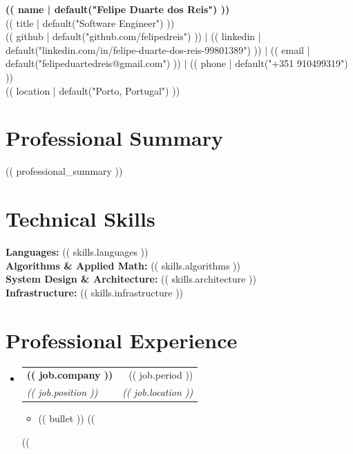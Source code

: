 \documentclass[11pt, letterpaper]{article}
\makeatletter
\newcommand{\resumeItem}[1]{\item \small{#1 \vspace{-2pt}}}
\newcommand{\resumeSubheading}[4]{
  \vspace{3pt}\item
    \begin{tabular*}{0.98\textwidth}[t]{l@{\extracolsep{\fill}}r}
      \textbf{#1} & #2 \\
      \textit{#3} & \textit{\small #4} \\
    \end{tabular*}\vspace{-5pt}
}
\makeatother
\begin{document}
\begin{center}
    {\LARGE \textbf{(( name | default("Felipe Duarte dos Reis") ))}} \\ \vspace{4pt}
    (( title | default("Software Engineer") )) \\
    \small 
    (( github | default("github.com/felipedreis") )) $|$ 
    (( linkedin | default("linkedin.com/in/felipe-duarte-dos-reis-99801389") )) $|$
    (( email | default("felipeduartedreis@gmail.com") )) $|$
    (( phone | default("+351 910499319") ))\\
    \small \faMapMarker \space (( location | default("Porto, Portugal") ))
\end{center}

\section{Professional Summary}
\vspace{2pt}
\small{(( professional_summary ))}

\section{Technical Skills}
\vspace{2pt}
\small{
\textbf{Languages:} (( skills.languages )) \\
\textbf{Algorithms \& Applied Math:} (( skills.algorithms )) \\
\textbf{System Design \& Architecture:} (( skills.architecture )) \\
\textbf{Infrastructure:} (( skills.infrastructure ))
}

\section{Professional Experience}
\begin{itemize}[leftmargin=0in, label={}]

    ((%
    \resumeSubheading
      {(( job.company ))}{(( job.period ))}
      {(( job.position ))}{(( job.location ))}
      \begin{itemize}
        ((%
        \resumeItem{(( bullet ))}
        ((%
      \end{itemize}
    ((%

\end{itemize}
\end{document}
